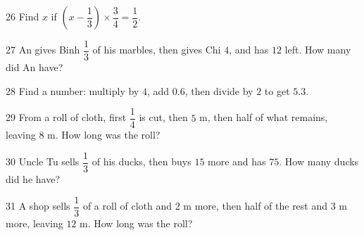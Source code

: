 \gap
\begin{probbox}{26}{\relax}
Find $x$ if $\left(x-\dfrac13\right)\times\dfrac34=\dfrac12$.
\end{probbox}
\gap
\begin{probbox}{27}{\relax}
An gives Binh $\dfrac13$ of his marbles, then gives Chi $4$, and has $12$ left. How many did An have?
\end{probbox}
\gap
\begin{probbox}{28}{\relax}
Find a number: multiply by $4$, add $0.6$, then divide by $2$ to get $5.3$.
\end{probbox}
\gap
\begin{probbox}{29}{\relax}
From a roll of cloth, first $\dfrac14$ is cut, then $5$ m, then half of what remains, leaving $8$ m. How long was the roll?
\end{probbox}
\gap
\begin{probbox}{30}{\relax}
Uncle Tu sells $\dfrac13$ of his ducks, then buys $15$ more and has $75$. How many ducks did he have?
\end{probbox}
\begin{probbox}{31}{}
A shop sells $\dfrac13$ of a roll of cloth and $2$ m more, then half of the rest and $3$ m more, leaving $12$ m. How long was the roll?
\end{probbox}
